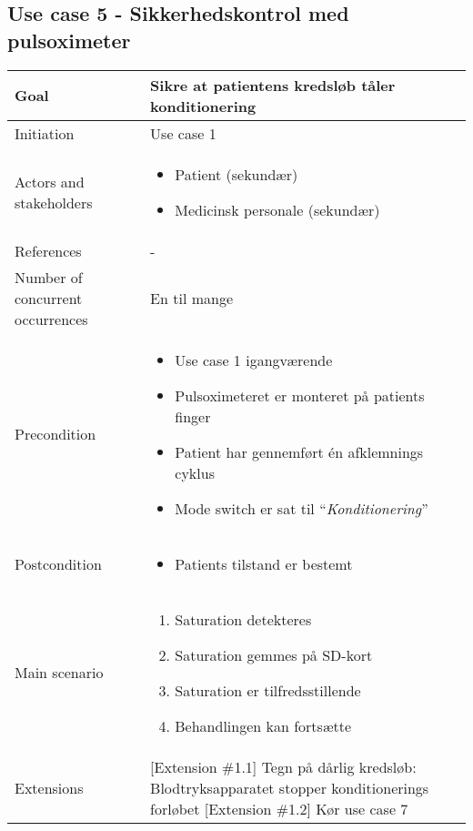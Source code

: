 	\subsection{Use case 5 - Sikkerhedskontrol med pulsoximeter}
		\begin{center}
			\begin{tabular}{ | p{} | p{}| } 
				\hline
				Goal& Sikre at patientens kredsløb tåler konditionering \\ 
				\hline
				Initiation &  Use case 1\\
				\hline
				Actors and stakeholders & 
				\begin{itemize}
					\item Patient (sekundær)
					\item Medicinsk personale (sekundær)
				\end{itemize} \\ 
				\hline
				References & - \\ 
				\hline
				Number of concurrent occurrences & En til mange \\ 
				\hline	
				Precondition & 
				\begin{itemize}
					\item Use case 1 igangværende
					\item Pulsoximeteret er monteret på patients finger
					\item Patient har gennemført én afklemnings cyklus
					\item Mode switch er sat til “\textit{Konditionering}”
 				\end{itemize} \\ 
				\hline
				Postcondition & 
				\begin{itemize}
					\item Patients tilstand er bestemt 
				\end{itemize} \\ 
				\hline
				Main scenario & \begin{enumerate}
					\setlength\itemsep{0cm} %
					\item Saturation detekteres
					\item Saturation gemmes på SD-kort
					\item Saturation er tilfredsstillende
					\subitem [Extension \#1.1][Extension \#1.2]
					\item Behandlingen kan fortsætte
				\end{enumerate} \\ 
				\hline
				Extensions &  [Extension \#1.1] Tegn på dårlig kredsløb: Blodtryksapparatet stopper konditionerings forløbet 
				[Extension \#1.2] Kør use case 7\\ 
				\hline
			\end{tabular}
		\end{center}
			\pagebreak